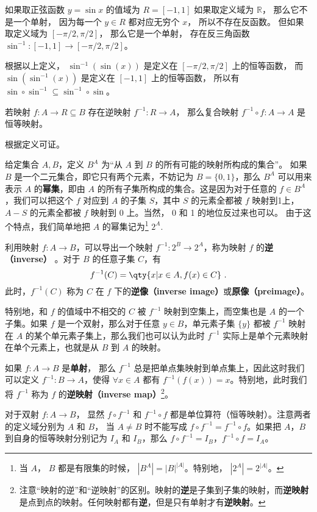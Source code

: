 \begin{example}{}
如果取正弦函数 $y = \sin x$ 的值域为 $R = [-1, 1]$ 如果取定义域为 $\mathbb R$，  那么它不是一个单射， 因为每一个 $y \in R$ 都对应无穷个 $x$， 所以不存在反函数。 但如果取定义域为 $[-\pi/2, \pi/2]$， 那么它是一个单射， 存在反三角函数 $\sin^{-1}: [-1, 1] \to [-\pi/2, \pi/2]$。

根据以上定义， $\sin^{-1} (\sin(x))$ 是定义在 $[-\pi/2, \pi/2]$ 上的恒等函数， 而 $\sin (\sin^{-1}(x))$ 是定义在 $[-1, 1]$ 上的恒等函数， 所以有 $\sin \circ \sin^{-1} \subseteq \sin^{-1} \circ \sin$。
\end{example}

\begin{corollary}{}
若映射 $f: A  \to R \subseteq B$ 存在逆映射 $f^{-1}: R \to A$， 那么复合映射 $f^{-1} \circ f: A \to A$ 是恒等映射。
\end{corollary}
根据定义可证。


给定集合 $A, B$，定义 $B^A$ 为“从 $A$ 到 $B$ 的所有可能的映射所构成的集合”。 如果 $B$ 是一个二元集合，即它只有两个元素，不妨记为 $B=\{0,1\}$，那么 $B^A$ 可以用来表示 $A$ 的\textbf{幂集}，即由 $A$ 的所有子集所构成的集合。这是因为对于任意的 $f\in B^A$，我们可以把这个 $f$ 对应到 $A$ 的子集 $S$，其中 $S$ 的元素全都被 $f$ 映射到1上， $A-S$ 的元素全都被 $f$ 映射到 0 上。当然， 0 和 1 的地位反过来也可以。 由于这个特点，我们简单地把 $A$ 的幂集记为\footnote{当 $A$， $B$ 都是有限集的时候， $|B^A|=|B|^{|A|}$。特别地， $|2^A|=2^{|A|}$。}  $2^A$. 

利用映射 $f: A \to B$，可以导出一个映射 $f^{-1}:2^B \to 2^A$，称为映射 $f$ 的\textbf{逆（inverse）} 。对于 $B$ 的任意子集 $C$，有
\begin{equation}
f^{-1}(C) = \qty{x | x \in A, f(x) \in C}~.
\end{equation}
此时，$f^{-1}(C)$ 称为 $C$ 在 $f$ 下的\textbf{逆像（inverse image）}或\textbf{原像（preimage）}。

特别地，和 $f$ 的值域中不相交的 $C$ 被 $f^{-1}$ 映射到空集上，而空集也是 $A$ 的一个子集。如果 $f$ 是一个双射，那么对于任意 $y\in B$，单元素子集 $\{y\}$ 都被 $f^{-1}$ 映射在 $A$ 的某个单元素子集上，那么我们也可以认为此时 $f^{-1}$ 实际上是单个元素映射在单个元素上，也就是从 $B$ 到 $A$ 的映射。

如果 $f: A \to B$ 是\textbf{单射}， 那么 $f^{-1}$ 总是把单点集映射到单点集上，因此这时我们可以定义 $f^{-1}:B\to A$，使得 $\forall x\in A$ 都有 $f^{-1}(f(x))=x$。特别地，此时我们将 $f^{-1}$ 称为 $f$ 的\textbf{逆映射（inverse map）}\footnote{注意“映射的逆”和“逆映射”的区别。映射的\textbf{逆}是子集到子集的映射，而\textbf{逆映射}是点到点的映射。任何映射都有\textbf{逆}，但是只有单射才有\textbf{逆映射}。}。

对于双射 $f: A \to B$， 显然 $f\circ f^{-1}$ 和 $f^{-1}\circ f$ 都是单位算符（恒等映射）。注意两者的定义域分别为 $A$ 和 $B$， 当 $A \ne B$ 时不能写成 $f\circ f^{-1} = f^{-1}\circ f$。如果把 $A$，$B$ 到自身的恒等映射分别记为 $I_A$ 和 $I_B$，那么 $f\circ f^{-1}=I_B$，$f^{-1}\circ f=I_A$。
